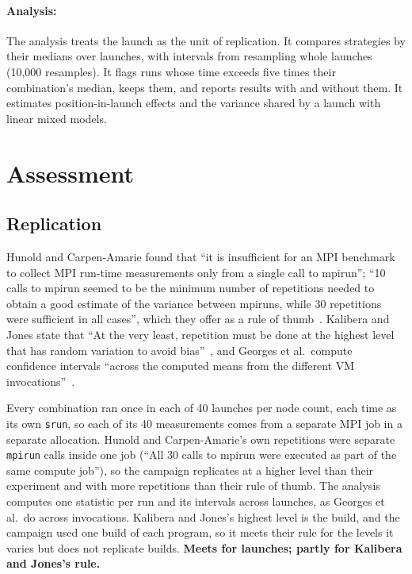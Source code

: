 \documentclass[11pt]{article}
\newcommand{\verdict}[1]{\textbf{#1}}
\begin{document}
\paragraph{Analysis:} The analysis treats the launch as the unit of replication. It
compares strategies by their medians over launches, with intervals from resampling whole
launches (10,000 resamples). It flags runs whose time exceeds five times their
combination's median, keeps them, and reports results with and without them. It
estimates position-in-launch effects and the variance shared by a launch with linear
mixed models.

\section{Assessment}
\label{sec:assessment}

\subsection{Replication}

Hunold and Carpen-Amarie found that ``it is insufficient for an MPI benchmark to collect
MPI run-time measurements only from a single call to mpirun''; ``10 calls to mpirun
seemed to be the minimum number of repetitions needed to obtain a good estimate of the
variance between mpiruns, while 30 repetitions were sufficient in all cases'', which
they offer as a rule of thumb~\cite[Section~4.2]{hunold2016reproducible}. Kalibera and
Jones state that ``At the very least, repetition must be done at the highest level that
has random variation to avoid bias''~\cite{kalibera2013rigorous}, and Georges et al.\
compute confidence intervals ``across the computed means from the different VM
invocations''~\cite{georges2007statistically}.

Every combination ran once in each of 40 launches per node count, each time as its own
\texttt{srun}, so each of its 40 measurements comes from a separate MPI job in a
separate allocation. Hunold and Carpen-Amarie's own repetitions were separate
\texttt{mpirun} calls inside one job (``All 30 calls to mpirun were executed as part of
the same compute job''), so the campaign replicates at a higher level than their
experiment and with more repetitions than their rule of thumb. The analysis computes one
statistic per run and its intervals across launches, as Georges et al.\ do across
invocations. Kalibera and Jones's highest level is the build, and the campaign used one
build of each program, so it meets their rule for the levels it varies but does not
replicate builds. \verdict{Meets for launches; partly for Kalibera and Jones's rule.}
\end{document}
